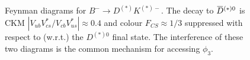 \documentclass[oneside,12pt]{article}
\newcommand{\overbar}[1]{\mkern 1.5mu\overline{\mkern-1.5mu#1\mkern-1.5mu}\mkern
1.5mu}
\begin{document}
\begin{figure}[htp]
\vspace*{-7mm}
\centering
{}
	\caption{{Feynman diagrams for ${B}^{-}\rightarrow{D}^{(*)}{K}^{(*)-}$}.
The decay to $\overbar{{D}}^{(*)0}$ is CKM
$|V_{ub}V^{*}_{cs}/V_{cb}V^{*}_{us}|\approx0.4$ and colour ${F}_{CS}\approx1/3$
suppressed with respect to (w.r.t.) the ${D}^{(*)0}$ final state. The
interference of these two diagrams is the common mechanism for accessing
$\phi_3$.}
	\label{fig:B2DstarKstar}
	\vspace{-10pt}
\end{figure}
\end{document}
